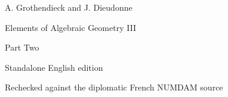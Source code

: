 \documentclass[10pt,oneside]{book}
\begin{document}
\begin{titlepage}
  \centering
  {\Large A. Grothendieck and J. Dieudonne\par}
  \vfill
  {\Huge Elements of Algebraic Geometry III\par}
  \vspace{1.5ex}
  {\LARGE Part Two\par}
  \vfill
  {\large Standalone English edition\par}
  \vspace{1ex}
  {\small Rechecked against the diplomatic French NUMDAM source\par}
\end{titlepage}

\setcounter{section}{5}
\setcounter{subsection}{0}
\setcounter{equation}{0}
\setcounter{footnote}{0}


\end{document}

